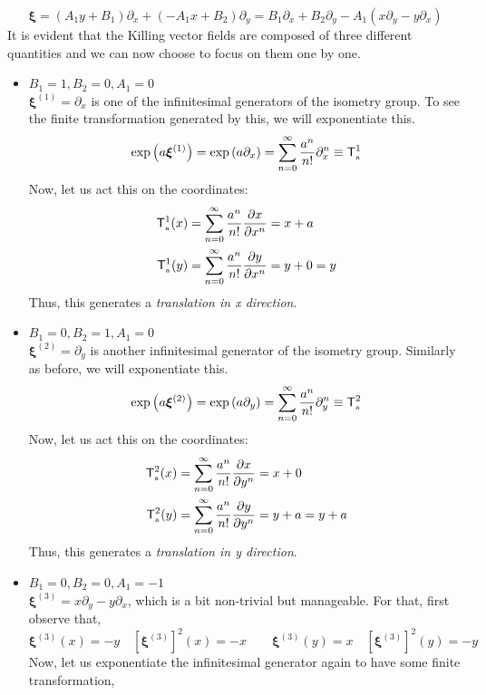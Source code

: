 $$\boldsymbol{\xi} = (A_1 y+B_1) \partial_x +(-A_1x+B_2) \partial_y = B_1\partial_x + B_2\partial_y -A_1(x\partial_y-y\partial_x)$$
It is evident that the Killing vector fields are composed of three different quantities and we can now choose to focus on them one by one. 
\begin{itemize}[label=$\triangleright$]
  \item $\boxed{B_1=1, B_2=0, A_1=0}$\\[0.2cm]
  $\boldsymbol{\xi}^{(1)}=\partial_x$ is one of the infinitesimal generators of the isometry group. To see the finite transformation generated by this, we will exponentiate this. 
  $$\exp\qty(a \boldsymbol{\xi}^{(1)})=\exp\qty(a \partial_x) = \sum\limits_{n=0}^\infty \frac{a^n}{n!}\partial_x^n \equiv \mathsf{T}^1_{\text{\tiny a}}$$
  Now, let us act this on the coordinates:
  \begin{align*}
    \mathsf{T}^1_{\text{\tiny a}}(x) &= \sum\limits_{n=0}^\infty \frac{a^n}{n!}\pdv{x}{x^n}=x + a \\
\mathsf{T}^1_{\text{\tiny a}}(y) &= \sum\limits_{n=0}^\infty \frac{a^n}{n!}\pdv{y}{x^n}=y + 0 = y
  \end{align*}
  Thus, this generates a \textit{translation in x direction}.
  \item $\boxed{B_1=0, B_2=1, A_1=0}$\\[0.2cm]
  $\boldsymbol{\xi}^{(2)}=\partial_y$ is another infinitesimal generator of the isometry group. Similarly as before, we will exponentiate this. 
  $$\exp\qty(a \boldsymbol{\xi}^{(2)})=\exp\qty(a \partial_y) = \sum\limits_{n=0}^\infty \frac{a^n}{n!}\partial_y^n \equiv \mathsf{T}^2_{\text{\tiny a}}$$
  Now, let us act this on the coordinates:
  \begin{align*}
    \mathsf{T}^2_{\text{\tiny a}}(x) &= \sum\limits_{n=0}^\infty \frac{a^n}{n!}\pdv{x}{y^n}=x + 0 \\
\mathsf{T}^2_{\text{\tiny a}}(y) &= \sum\limits_{n=0}^\infty \frac{a^n}{n!}\pdv{y}{y^n}=y + a = y+a
  \end{align*}
  Thus, this generates a \textit{translation in y direction}.
   \item $\boxed{B_1=0, B_2=0, A_1=-1}$\\[0.2cm]
   $\boldsymbol{\xi}^{(3)}=x\partial_y-y\partial_x$, which is a bit non-trivial but manageable. For that, first observe that,
   $$\boldsymbol{\xi}^{(3)}(x) = -y \quad [\boldsymbol{\xi}^{(3)}]^2(x) = -x \qquad \boldsymbol{\xi}^{(3)}(y) = x\quad [\boldsymbol{\xi}^{(3)}]^2(y) = -y$$
Now, let us exponentiate the infinitesimal generator again to have some finite transformation,

\end{itemize}
